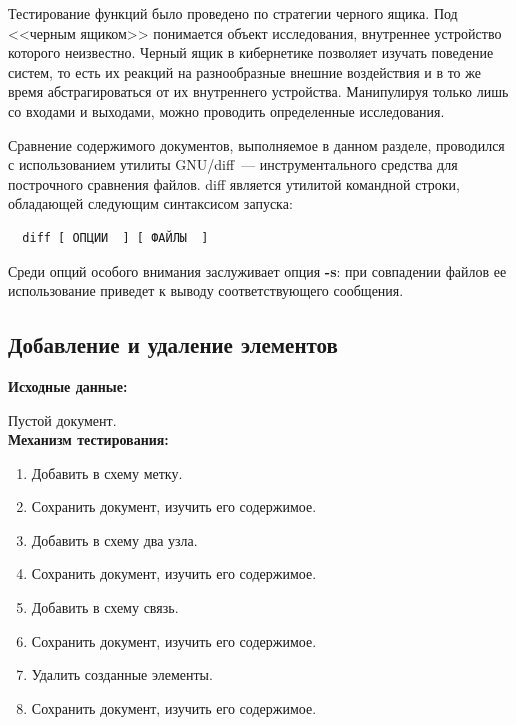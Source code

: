Тестирование функций было проведено по стратегии черного ящика.
Под <<черным ящиком>> понимается объект исследования, внутреннее устройство которого неизвестно.
Черный ящик в кибернетике позволяет изучать поведение систем, то есть их реакций на разнообразные внешние воздействия и в то же время абстрагироваться от их внутреннего устройства.
Манипулируя только лишь со входами и выходами, можно проводить определенные исследования.

Сравнение содержимого документов, выполняемое в данном разделе, проводился с использованием утилиты GNU/diff~--- инструментального средства для построчного сравнения файлов.
diff является утилитой командной строки, обладающей следующим синтаксисом запуска:
\begin{lstlisting}
  diff [ ОПЦИИ  ] [ ФАЙЛЫ  ]
\end{lstlisting}

Среди опций особого внимания заслуживает опция \textbf{-s}: при совпадении файлов ее использование приведет к выводу соответствующего сообщения.

\subsection{Добавление и удаление элементов}
\textbf{Исходные данные:}

Пустой документ.\\

\textbf{Механизм тестирования:}
\begin{enumerate}
  \item Добавить в схему метку.
  \item Сохранить документ, изучить его содержимое.
  \item Добавить в схему два узла.
  \item Сохранить документ, изучить его содержимое.
  \item Добавить в схему связь.
  \item Сохранить документ, изучить его содержимое.
  \item Удалить созданные элементы.
  \item Сохранить документ, изучить его содержимое.
\end{enumerate}

